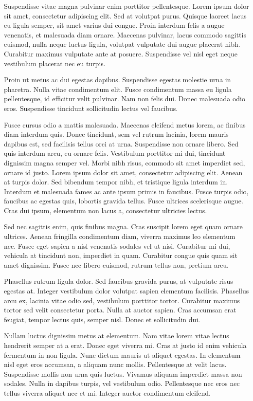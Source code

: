 Suspendisse vitae magna pulvinar enim porttitor pellentesque. Lorem ipsum dolor sit amet, consectetur adipiscing elit. Sed at volutpat purus. Quisque laoreet lacus eu ligula semper, sit amet varius dui congue. Proin interdum felis a augue venenatis, et malesuada diam ornare. Maecenas pulvinar, lacus commodo sagittis euismod, nulla neque luctus ligula, volutpat vulputate dui augue placerat nibh. Curabitur maximus vulputate ante at posuere. Suspendisse vel nisl eget neque vestibulum placerat nec eu turpis.

Proin ut metus ac dui egestas dapibus. Suspendisse egestas molestie urna in pharetra. Nulla vitae condimentum elit. Fusce condimentum massa eu ligula pellentesque, id efficitur velit pulvinar. Nam non felis dui. Donec malesuada odio eros. Suspendisse tincidunt sollicitudin lectus vel faucibus.

Fusce cursus odio a mattis malesuada. Maecenas eleifend metus lorem, ac finibus diam interdum quis. Donec tincidunt, sem vel rutrum lacinia, lorem mauris dapibus est, sed facilisis tellus orci at urna. Suspendisse non ornare libero. Sed quis interdum arcu, eu ornare felis. Vestibulum porttitor mi dui, tincidunt dignissim magna semper vel. Morbi nibh risus, commodo sit amet imperdiet sed, ornare id justo. Lorem ipsum dolor sit amet, consectetur adipiscing elit. Aenean at turpis dolor. Sed bibendum tempor nibh, et tristique ligula interdum in. Interdum et malesuada fames ac ante ipsum primis in faucibus. Fusce turpis odio, faucibus ac egestas quis, lobortis gravida tellus. Fusce ultrices scelerisque augue. Cras dui ipsum, elementum non lacus a, consectetur ultricies lectus.

Sed nec sagittis enim, quis finibus magna. Cras suscipit lorem eget quam ornare ultrices. Aenean fringilla condimentum diam, viverra maximus leo elementum nec. Fusce eget sapien a nisl venenatis sodales vel ut nisi. Curabitur mi dui, vehicula at tincidunt non, imperdiet in quam. Curabitur congue quis quam sit amet dignissim. Fusce nec libero euismod, rutrum tellus non, pretium arcu.

Phasellus rutrum ligula dolor. Sed faucibus gravida purus, at vulputate risus egestas at. Integer vestibulum dolor volutpat sapien elementum facilisis. Phasellus arcu ex, lacinia vitae odio sed, vestibulum porttitor tortor. Curabitur maximus tortor sed velit consectetur porta. Nulla at auctor sapien. Cras accumsan erat feugiat, tempor lectus quis, semper nisl. Donec et sollicitudin dui.

Nullam luctus dignissim metus at elementum. Nam vitae lorem vitae lectus hendrerit semper at a erat. Donec eget viverra mi. Cras at justo id enim vehicula fermentum in non ligula. Nunc dictum mauris ut aliquet egestas. In elementum nisl eget eros accumsan, a aliquam nunc mollis. Pellentesque at velit lacus. Suspendisse mollis non urna quis luctus. Vivamus aliquam imperdiet massa non sodales. Nulla in dapibus turpis, vel vestibulum odio. Pellentesque nec eros nec tellus viverra aliquet nec et mi. Integer auctor condimentum eleifend.

